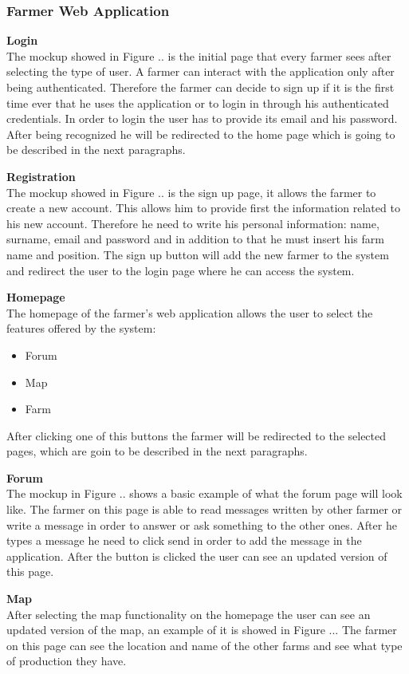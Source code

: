 \subsubsection{Farmer Web Application}
\textbf{Login}\\ 
The mockup showed in Figure .. is the initial page that every farmer sees after selecting the type of user. A  farmer can interact with the application only 
after being authenticated. Therefore the farmer can decide to sign up if it is the first time ever that he uses the application or to login in through his authenticated credentials.
In order to login the user has to provide its email and his password. After being recognized he will be redirected to the home page which is going to be described in the next paragraphs.

\textbf{Registration} \\
The mockup showed in Figure .. is the sign up page, it allows the farmer to create a new account. This allows him to provide first the information related to his new account. 
Therefore he need to write his personal information: name, surname, email and password and in addition to that he must insert his farm name and position.
The sign up button will add the new farmer to the system and redirect the user to the login page where he can access the system.

\textbf{Homepage}\\
The homepage of the farmer's web application allows the user to select the features offered by the system:
\begin{itemize}
    \item Forum
    \item Map
    \item Farm
\end{itemize}
After clicking one of this buttons the farmer will be redirected to the selected pages, which are goin to be described in the next paragraphs.

\textbf{Forum}\\
The mockup in Figure .. shows a basic example of what the forum page will look like. The farmer on this page is able to read messages written by other farmer or 
write a message in order to answer or ask something to the other ones. After he types a message he need to click send in order to add the message in the application. 
After the button is clicked the user can see an updated version of this page.

\textbf{Map}\\
After selecting the map functionality on the homepage the user can see an updated version of the map, 
an example of it is showed in Figure ... The farmer on this page can see the location and name of the other farms and see what type of production 
they have.


